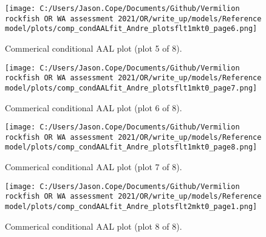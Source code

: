 \documentclass[11pt,
  english,
  a4paper,
]{article}
\begin{document}
\tagmcend\tagstructend


\begin{figure}
\centering
\texttt{[image: C:/Users/Jason.Cope/Documents/Github/Vermilion rockfish OR WA assessment 2021/OR/write\_up/models/Reference model/plots/comp\_condAALfit\_Andre\_plotsflt1mkt0\_page6.png]}
\caption{Commerical conditional AAL plot (plot 5 of 8).\label{fig:comp_condAALfit_Andre_plotsflt1mkt0_page6}}
\end{figure}

\tagmcend\tagstructend


\begin{figure}
\centering
\texttt{[image: C:/Users/Jason.Cope/Documents/Github/Vermilion rockfish OR WA assessment 2021/OR/write\_up/models/Reference model/plots/comp\_condAALfit\_Andre\_plotsflt1mkt0\_page7.png]}
\caption{Commerical conditional AAL plot (plot 6 of 8).\label{fig:comp_condAALfit_Andre_plotsflt1mkt0_page7}}
\end{figure}

\tagmcend\tagstructend


\begin{figure}
\centering
\texttt{[image: C:/Users/Jason.Cope/Documents/Github/Vermilion rockfish OR WA assessment 2021/OR/write\_up/models/Reference model/plots/comp\_condAALfit\_Andre\_plotsflt1mkt0\_page8.png]}
\caption{Commerical conditional AAL plot (plot 7 of 8).\label{fig:comp_condAALfit_Andre_plotsflt1mkt0_page8}}
\end{figure}

\tagmcend\tagstructend


\begin{figure}
\centering
\texttt{[image: C:/Users/Jason.Cope/Documents/Github/Vermilion rockfish OR WA assessment 2021/OR/write\_up/models/Reference model/plots/comp\_condAALfit\_Andre\_plotsflt2mkt0\_page1.png]}
\caption{Commerical conditional AAL plot (plot 8 of 8).\label{fig:comp_condAALfit_Andre_plotsflt2mkt0_page1}}
\end{figure}
\end{document}
